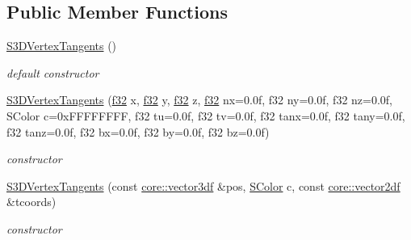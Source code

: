 \subsection*{Public Member Functions}
\begin{DoxyCompactItemize}
\item 
\mbox{\label{structirr_1_1video_1_1S3DVertexTangents_a73c272df89a8d4d3cb5c94363a4b85d1}} 
\hyperlink{structirr_1_1video_1_1S3DVertexTangents_a73c272df89a8d4d3cb5c94363a4b85d1}{S3\+D\+Vertex\+Tangents} ()
\begin{DoxyCompactList}\small\item\em default constructor \end{DoxyCompactList}\item 
\mbox{\label{structirr_1_1video_1_1S3DVertexTangents_a9e0e424a375e5b090ba5c237a87feff2}} 
\hyperlink{structirr_1_1video_1_1S3DVertexTangents_a9e0e424a375e5b090ba5c237a87feff2}{S3\+D\+Vertex\+Tangents} (\hyperlink{namespaceirr_a0277be98d67dc26ff93b1a6a1d086b07}{f32} x, \hyperlink{namespaceirr_a0277be98d67dc26ff93b1a6a1d086b07}{f32} y, \hyperlink{namespaceirr_a0277be98d67dc26ff93b1a6a1d086b07}{f32} z, \hyperlink{namespaceirr_a0277be98d67dc26ff93b1a6a1d086b07}{f32} nx=0.\+0f, f32 ny=0.\+0f, f32 nz=0.\+0f, S\+Color c=0x\+F\+F\+F\+F\+F\+F\+F\+F, f32 tu=0.\+0f, f32 tv=0.\+0f, f32 tanx=0.\+0f, f32 tany=0.\+0f, f32 tanz=0.\+0f, f32 bx=0.\+0f, f32 by=0.\+0f, f32 bz=0.\+0f)
\begin{DoxyCompactList}\small\item\em constructor \end{DoxyCompactList}\item 
\mbox{\label{structirr_1_1video_1_1S3DVertexTangents_a55532d7609227010fd31b3b9fbb4c03a}} 
\hyperlink{structirr_1_1video_1_1S3DVertexTangents_a55532d7609227010fd31b3b9fbb4c03a}{S3\+D\+Vertex\+Tangents} (const \hyperlink{namespaceirr_1_1core_a06f169d08b5c429f5575acb7edbad811}{core\+::vector3df} \&pos, \hyperlink{classirr_1_1video_1_1SColor}{S\+Color} c, const \hyperlink{namespaceirr_1_1core_a2cf08556d77f6f5a792973a6e27ed11b}{core\+::vector2df} \&tcoords)
\begin{DoxyCompactList}\small\item\em constructor \end{DoxyCompactList}\item 

\end{DoxyCompactItemize}

